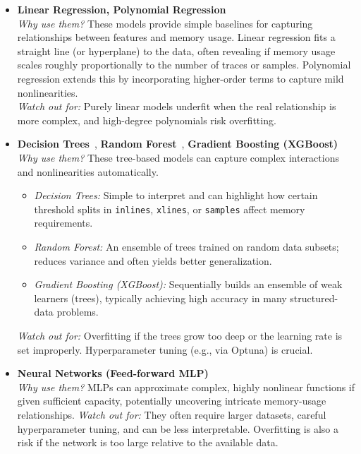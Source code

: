 \begin{itemize}
    \item \textbf{Linear Regression, Polynomial Regression}~\cite{hastie2009elements}\\
    \emph{Why use them?} These models provide simple baselines for capturing relationships between features and memory usage. Linear regression fits a straight line (or hyperplane) to the data, often revealing if memory usage scales roughly proportionally to the number of traces or samples. Polynomial regression extends this by incorporating higher-order terms to capture mild nonlinearities.\\
    \emph{Watch out for:} Purely linear models underfit when the real relationship is more complex, and high-degree polynomials risk overfitting.

    \item \textbf{Decision Trees}~\cite{breiman1984classification}, \textbf{Random Forest}~\cite{breiman2001random}, \textbf{Gradient Boosting (XGBoost)}~\cite{chen2016xgboost}\\
    \emph{Why use them?} These tree-based models can capture complex interactions and nonlinearities automatically.
    \begin{itemize}
        \item \emph{Decision Trees:} Simple to interpret and can highlight how certain threshold splits in \texttt{inlines}, \texttt{xlines}, or \texttt{samples} affect memory requirements.
        \item \emph{Random Forest:} An ensemble of trees trained on random data subsets; reduces variance and often yields better generalization.
        \item \emph{Gradient Boosting (XGBoost):} Sequentially builds an ensemble of weak learners (trees), typically achieving high accuracy in many structured-data problems.
    \end{itemize}
    \emph{Watch out for:} Overfitting if the trees grow too deep or the learning rate is set improperly. Hyperparameter tuning (e.g., via Optuna) is crucial.

    \item \textbf{Neural Networks (Feed-forward MLP)}~\cite{rumelhart1986learning}\\
    \emph{Why use them?} MLPs can approximate complex, highly nonlinear functions if given sufficient capacity, potentially uncovering intricate memory-usage relationships.
    \emph{Watch out for:} They often require larger datasets, careful hyperparameter tuning, and can be less interpretable. Overfitting is also a risk if the network is too large relative to the available data.


\end{itemize}
